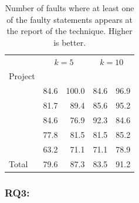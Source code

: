 \documentclass{article}
\begin{document}
\begin{table}[h]
	\vspace{-0.2cm}
	\small
	\setlength{\tabcolsep}{3pt}
	\centering
\begin{tabular}{l|rr|rr}
		 \toprule
       & \multicolumn{2}{c|}{$k=5$} & \multicolumn{2}{c}{$k=10$} \\
		 Project        &   \sfl{}   & \comb &   \sfl{}   & \comb\\
		\midrule
		 \lang{}         &   84.6   & 100.0 & 84.6 & 96.9  \\
		\cmath{}           & 81.7 & 89.4 & 85.6 & 95.2 \\
		\chart{}           & {\cellcolor{Gray} 84.6} & {\cellcolor{Gray}76.9} & {\cellcolor{Gray}92.3} & {\cellcolor{Gray}84.6}\\
		\jtime{}           & 77.8 & 81.5 & 81.5 & 85.2\\
		\mockito{}           & 63.2 & 71.1 & 71.1 & 78.9\\   \midrule
		Total         & 79.6 & 87.3 & 83.5 & 91.2\\
		\bottomrule
	\end{tabular}
  \caption {Number of faults where at least one of the faulty
    statements appears at the report of the technique. Higher is better.}
  \label{table:fsws}
\vspace{-0.4cm}
\end{table}

\subsubsection{RQ3: \textit{\rqthree}}

\newcommand{\numOutPerformed}{$33$}%
\newcommand{\numEquallyPerformed}{$110$}%
\end{document}

